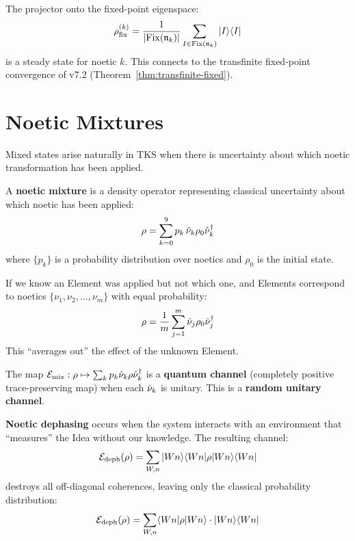 \begin{corollary}
\label{cor:fixed-point-steady}
The projector onto the fixed-point eigenspace:
\[
\rho_{\mathrm{fix}}^{(k)} = \frac{1}{|\mathrm{Fix}(\mathfrak{n}_k)|} \sum_{I \in \mathrm{Fix}(\mathfrak{n}_k)} |I\rangle\langle I|
\]
is a steady state for noetic $k$. This connects to the transfinite fixed-point convergence of v7.2 (Theorem~\ref{thm:transfinite-fixed}).
\end{corollary}

\section{Noetic Mixtures}
\label{sec:noetic-mixtures}

Mixed states arise naturally in TKS when there is uncertainty about which noetic transformation has been applied.

\begin{definition}
\label{def:noetic-mixture}
A \textbf{noetic mixture} is a density operator representing classical uncertainty about which noetic has been applied:
\[
\rho = \sum_{k=0}^{9} p_k \, \hat{\nu}_k \rho_0 \hat{\nu}_k^\dagger
\]
where $\{p_k\}$ is a probability distribution over noetics and $\rho_0$ is the initial state.
\end{definition}

\begin{example}
\label{ex:uncertain-element}
If we know an Element was applied but not which one, and Elements correspond to noetics $\{\nu_1, \nu_2, \ldots, \nu_m\}$ with equal probability:
\[
\rho = \frac{1}{m} \sum_{j=1}^{m} \hat{\nu}_j \rho_0 \hat{\nu}_j^\dagger
\]
This ``averages out'' the effect of the unknown Element.
\end{example}

\begin{proposition}
\label{prop:mixture-channel}
The map $\mathcal{E}_{\mathrm{mix}} : \rho \mapsto \sum_k p_k \hat{\nu}_k \rho \hat{\nu}_k^\dagger$ is a \textbf{quantum channel} (completely positive trace-preserving map) when each $\hat{\nu}_k$ is unitary. This is a \textbf{random unitary channel}.
\end{proposition}

\begin{definition}
\label{def:noetic-dephasing}
\textbf{Noetic dephasing} occurs when the system interacts with an environment that ``measures'' the Idea without our knowledge. The resulting channel:
\[
\mathcal{E}_{\mathrm{deph}}(\rho) = \sum_{W,n} |Wn\rangle\langle Wn| \rho |Wn\rangle\langle Wn|
\]
destroys all off-diagonal coherences, leaving only the classical probability distribution:
\[
\mathcal{E}_{\mathrm{deph}}(\rho) = \sum_{W,n} \langle Wn|\rho|Wn\rangle \cdot |Wn\rangle\langle Wn|
\]
\end{definition}

